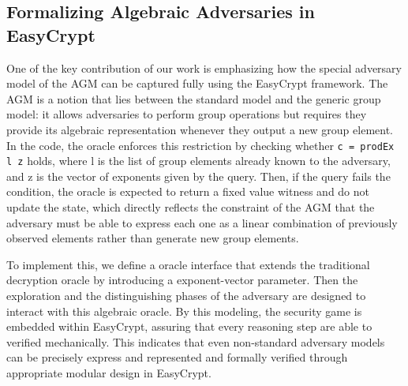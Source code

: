 \subsection{Formalizing Algebraic Adversaries in EasyCrypt}
One of the key contribution of our work is emphasizing how the special adversary model of the AGM can be captured fully using the EasyCrypt framework. The AGM is a notion that lies between the standard model and the generic group model: it allows adversaries to perform group operations but requires they provide its algebraic representation whenever they output a new group element. In the code, the oracle enforces this restriction by checking whether \texttt{c = prodEx l z} holds, 
where l is the list of group elements already known to the adversary, 
and z is the vector of exponents given by the query. 
Then, if the query fails the condition, the oracle is expected to return a fixed value witness and do not update the state, which directly reflects the constraint of the AGM that the adversary must be able to express each one as a linear combination of previously observed elements rather than generate new group elements.

To implement this, we define a oracle interface that extends the traditional decryption oracle by introducing a exponent-vector parameter. Then the exploration and the distinguishing phases of the adversary are designed to interact with this algebraic oracle. By this modeling, the security game is embedded within EasyCrypt, assuring that every reasoning step are able to verified mechanically. This indicates that even non-standard adversary models can be precisely express and represented and formally verified through appropriate modular design in EasyCrypt.



